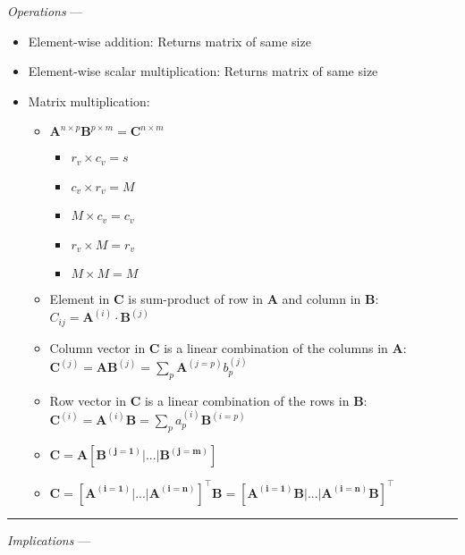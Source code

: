 \emph{Operations} ---
\begin{itemize}
    \item Element-wise addition: Returns matrix of same size
    \item Element-wise scalar multiplication: Returns matrix of same size
    \item Matrix multiplication: 
    \begin{itemize}
        \item $\boldsymbol{A}^{n \times p}\boldsymbol{B}^{p \times m}=\boldsymbol{C}^{n \times m}$
        \begin{multicols}{2}
        \begin{itemize}
            \item $r_v \times c_v = s$
            \item $c_v \times r_v = M$
            \item $M \times c_v = c_v$
            \item $r_v \times M = r_v$ 
            \item $M \times M = M$
        \end{itemize}
        \end{multicols}
        \item Element in $\boldsymbol{C}$ is sum-product of row in $\boldsymbol{A}$ and column in $\boldsymbol{B}$: $C_{ij} = \boldsymbol{A}^{(i)} \cdot \boldsymbol{B}^{(j)}$
        \item Column vector in $\boldsymbol{C}$ is a linear combination of the columns in $\boldsymbol{A}$: $\boldsymbol{C}^{(j)} = \boldsymbol{A} \boldsymbol{B}^{(j)} = \sum_p \boldsymbol{A}^{(j=p)} b_{p}^{(j)}$
        \item Row vector in $\boldsymbol{C}$ is a linear combination of the rows in $\boldsymbol{B}$: $\boldsymbol{C}^{(i)} = \boldsymbol{A}^{(i)} \boldsymbol{B} = \sum_p a_{p}^{(i)} \boldsymbol{B}^{(i=p)}$
        \item $\boldsymbol{C} = \boldsymbol{A}[\boldsymbol{B^{(j=1)}} | ... | \boldsymbol{B^{(j=m)}}]$
        \item $\boldsymbol{C} = [\boldsymbol{A^{(i=1)}} | ... | \boldsymbol{A^{(i=n)}}]^\intercal \boldsymbol{B} = [\boldsymbol{A^{(i=1)}} \boldsymbol{B} | ... | \boldsymbol{A^{(i=n)}} \boldsymbol{B}]^\intercal$
    \end{itemize}
\end{itemize}

{\color{lightgray}\hrule height 0.001mm}

\emph{Implications} ---

